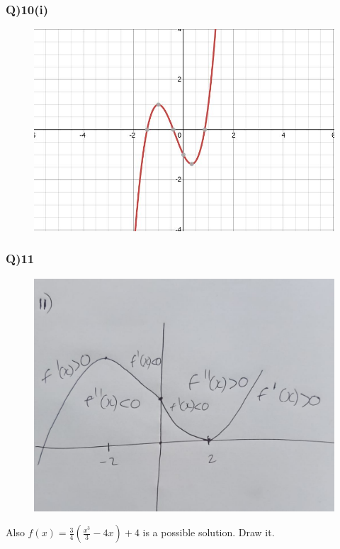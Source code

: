 \documentclass[11pt]{beamer}
\begin{document}
\begin{frame}
\frametitle{Q)10(i)}
\begin{figure}[t]
\includegraphics[scale=0.5]{graph}
\centering
\end{figure}
\end{frame}
\begin{frame}
\frametitle{Q)11}
\begin{figure}[t]
\includegraphics[scale=0.2]{11}
\centering
\end{figure}
Also $f(x)=\frac{3}{4}(\frac{x^3}{3}-4x)+4$ is a possible solution. Draw it.
\end{frame}
\end{document}
